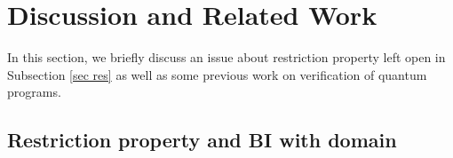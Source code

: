 \documentclass[conference,compsoc, 10pt]{IEEEtran}
\newcommand {\id } {{I}}
\newcommand {\unia } {{\mathbf{U}}}
\newcommand {\prog } {{\mathbf{C}}}
\newcommand{\sd}{\diamond}%
\def\>{\ensuremath{\rangle}}
\begin{document}
	
	
	
	
	\section{Discussion and Related Work}
	\label{sec:discussion}
	
	\vspace{-0.05cm}
	
	In this section, we briefly discuss an issue about restriction property left open in Subsection \ref{sec res} as well as some previous work on verification of quantum programs.  	
	
	\subsection{Restriction property and BI with domain}
	
	\vspace{-0.05cm}
	
\end{document}
